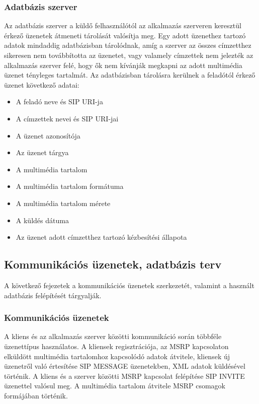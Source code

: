 \subsubsection{Adatbázis szerver}
\label{sec:dbserver}

Az adatbázis szerver a küldő felhasználótól az alkalmazás szerveren keresztül érkező üzenetek átmeneti tárolását valósítja meg. Egy adott üzenethez tartozó adatok mindaddig adatbázisban tárolódnak, amíg a szerver az összes címzetthez sikeresen nem továbbította az üzenetet, vagy valamely címzettek nem jelezték az alkalmazás szerver felé, hogy ők nem kívánják megkapni az adott multimédia üzenet tényleges tartalmát. Az adatbázisban tárolásra kerülnek a feladótól érkező üzenet következő adatai:

\begin{itemize}\itemsep1pt
\item	A feladó neve és SIP URI-ja
\item A címzettek nevei és SIP URI-jai
\item A üzenet azonosítója
\item Az üzenet tárgya
\item A multimédia tartalom
\item A multimédia tartalom formátuma
\item A multimédia tartalom mérete
\item A küldés dátuma
\item Az üzenet adott címzetthez tartozó kézbesítési állapota
\end{itemize}


\subsection{Kommunikációs üzenetek, adatbázis terv}

A következő fejezetek a kommunikációs üzenetek szerkezetét, valamint a használt adatbázis felépítését tárgyalják.

\subsubsection{Kommunikációs üzenetek}
\label{sec:komm_uzenetek}

A kliens és az alkalmazás szerver közötti kommunikáció során többféle üzenettípus használatos. A kliensek regisztrációja, az MSRP kapcsolaton elküldött multimédia tartalomhoz kapcsolódó adatok átvitele, kliensek új üzenetről való értesítése SIP MESSAGE üzenetekben, XML adatok küldésével történik. A kliens és a szerver közötti MSRP kapcsolat felépítése SIP INVITE üzenettel valósul meg. A multimédia tartalom átvitele MSRP csomagok formájában történik. 

